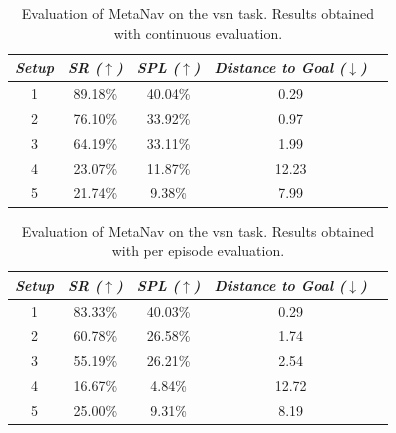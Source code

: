 \begin{table}
    \centering
    \begin{tabular}{c|cccc}
        \toprule
        \textit{\textbf{Setup}} & \textit{\textbf{SR ($\uparrow$)}} & \textbf{\textit{SPL ($\uparrow$)}} & \textit{\textbf{Distance to Goal ($\downarrow$)}} \\ \midrule
        1                       & 89.18\%                           & 40.04\%                            & 0.29                                              \\
        2                       & 76.10\%                           & 33.92\%                            & 0.97                                              \\
        3                       & 64.19\%                           & 33.11\%                            & 1.99                                              \\
        4                       & 23.07\%                           & 11.87\%                            & 12.23                                             \\
        5                       & 21.74\%                           & 9.38\%                             & 7.99                                              \\
    \end{tabular}
    \caption{Evaluation of MetaNav on the \acrshort{vsn} task. Results obtained with continuous evaluation.}
    \label{tab:metanav_continuos}
\end{table}


\begin{table}
    \centering
    \begin{tabular}{c|cccc}
        \toprule
        \textit{\textbf{Setup}} & \textit{\textbf{SR ($\uparrow$)}} & \textbf{\textit{SPL ($\uparrow$)}} & \textit{\textbf{Distance to Goal ($\downarrow$)}} \\ \midrule
        1                       & 83.33\%                           & 40.03\%                            & 0.29                                              \\
        2                       & 60.78\%                           & 26.58\%                            & 1.74                                              \\
        3                       & 55.19\%                           & 26.21\%                            & 2.54                                              \\
        4                       & 16.67\%                           & 4.84\%                             & 12.72                                             \\
        5                       & 25.00\%                           & 9.31\%                             & 8.19                                              \\
    \end{tabular}
    \caption{Evaluation of MetaNav on the \acrshort{vsn} task. Results obtained with per episode evaluation.}
    \label{tab:metanav_episode}
\end{table}

